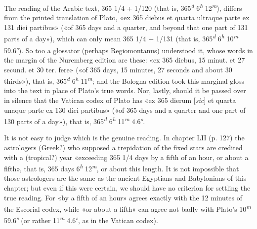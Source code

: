 \documentclass[11pt]{article}
\begin{document}
\par The reading of the Arabic text, 365 1/4 + 1/120 (that is, 365\textsuperscript{\itshape d} 6\textsuperscript{\itshape h} 12\textsuperscript{\itshape m}), differs from the printed translation of Plato, «ex 365 diebus et quarta ultraque parte ex 131 diei partibus» («of 365 days and a quarter, and beyond that one part of 131 parts of a day»), which can only mean 365 1/4 + 1/131 (that is, 365\textsuperscript{\itshape d} 6\textsuperscript{\itshape h} 10\textsuperscript{\itshape m} 59.6\textsuperscript{\itshape s}). So too a glossator (perhaps Regiomontanus) understood it, whose words in the margin of the Nuremberg edition are these: «ex 365 diebus, 15 minut. et 27 secund. et 30 ter. fere» («of 365 days, 15 minutes, 27 seconds and about 30 thirds»), that is, 365\textsuperscript{\itshape d} 6\textsuperscript{\itshape h} 11\textsuperscript{\itshape m}; and the Bologna edition took this marginal gloss into the text in place of Plato's true words. Nor, lastly, should it be passed over in silence that the Vatican codex of Plato has «ex 365 dierum [\emph{sic}] et quarta unaque parte ex 130 diei partibus» («of 365 days and a quarter and one part of 130 parts of a day»), that is, 365\textsuperscript{\itshape d} 6\textsuperscript{\itshape h} 11\textsuperscript{\itshape m} 4.6\textsuperscript{\itshape s}.\par
\par It is not easy to judge which is the genuine reading. In chapter LII (p. 127) the astrologers (Greek?) who supposed a trepidation of the fixed stars are credited with a (tropical?) year «exceeding 365 1/4 days by a fifth of an hour, or about a fifth», that is, 365 days 6\textsuperscript{\itshape h} 12\textsuperscript{\itshape m}, or about this length. It is not impossible that those astrologers are the same as the ancient Egyptians and Babylonians of this chapter; but even if this were certain, we should have no criterion for settling the true reading. For «by a fifth of an hour» agrees exactly with the 12 minutes of the Escorial codex, while «or about a fifth» can agree not badly with Plato's 10\textsuperscript{\itshape m} 59.6\textsuperscript{\itshape s} (or rather 11\textsuperscript{\itshape m} 4.6\textsuperscript{\itshape s}, as in the Vatican codex).\par
\end{document}
